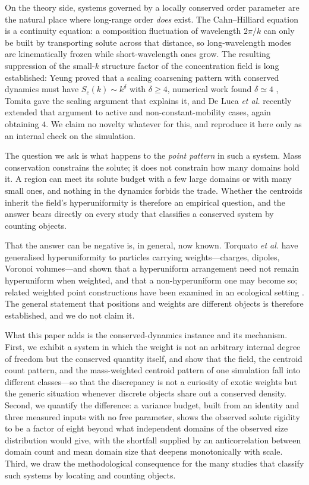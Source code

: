 \documentclass[aps,pre,twocolumn,superscriptaddress,floatfix,longbibliography]{revtex4-2}
\begin{document}
On the theory side, systems governed by a locally conserved order parameter
are the natural place where long-range order \emph{does} exist. The
Cahn--Hilliard equation \cite{CahnHilliard1958} is a continuity equation: a
composition fluctuation of wavelength $2\pi/k$ can only be built by
transporting solute across that distance, so long-wavelength modes are
kinematically frozen while short-wavelength ones grow. The resulting
suppression of the small-$k$ structure factor of the concentration field is
long established: Yeung \cite{Yeung1988} proved that a scaling coarsening
pattern with conserved dynamics must have $S_c(k) \sim k^{\delta}$ with
$\delta \ge 4$, numerical work found $\delta \simeq 4$
\cite{Furukawa1989}, Tomita \cite{Tomita1991} gave the scaling argument that
explains it, and De Luca \emph{et al.} \cite{DeLuca2024} recently extended
that argument to active and non-constant-mobility cases, again obtaining
$4$. We claim no novelty whatever for this, and reproduce it here only as an
internal check on the simulation.

The question we ask is what happens to the \emph{point pattern} in such a
system. Mass conservation constrains the solute; it does not constrain how
many domains hold it. A region can meet its solute budget with a few large
domains or with many small ones, and nothing in the dynamics forbids the
trade. Whether the centroids inherit the field's hyperuniformity is therefore
an empirical question, and the answer bears directly on every study that
classifies a conserved system by counting objects.

That the answer can be negative is, in general, now known. Torquato
\emph{et al.} \cite{TorquatoWeighted2026} have generalised hyperuniformity to
particles carrying weights---charges, dipoles, Voronoi volumes---and shown
that a hyperuniform arrangement need not remain hyperuniform when weighted,
and that a non-hyperuniform one may become so; related weighted point
constructions have been examined in an ecological setting
\cite{Ezoe2025}. The general statement that positions and weights are
different objects is therefore established, and we do not claim it.

What this paper adds is the conserved-dynamics instance and its mechanism.
First, we exhibit a system in which the weight is not an arbitrary internal
degree of freedom but the conserved quantity itself, and show that the field,
the centroid count pattern, and the mass-weighted centroid pattern of one
simulation fall into different classes---so that the discrepancy is not a
curiosity of exotic weights but the generic situation whenever discrete
objects share out a conserved density. Second, we quantify the difference: a
variance budget, built from an identity and three measured inputs with no free
parameter, shows the observed solute rigidity to be a factor of eight beyond
what independent domains of the observed size distribution would give, with
the shortfall supplied by an anticorrelation between domain count and mean
domain size that deepens monotonically with scale. Third, we draw the
methodological consequence for the many studies that classify such systems by
locating and counting objects.
\end{document}
